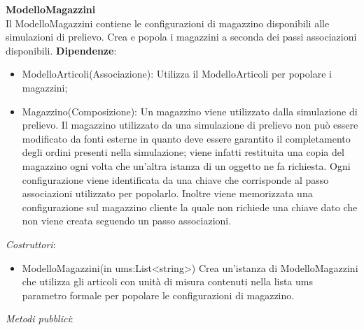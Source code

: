 \textbf{ModelloMagazzini}\\
Il ModelloMagazzini contiene le configurazioni di magazzino disponibili alle simulazioni di prelievo.
Crea e popola i magazzini a seconda dei passi associazioni disponibili.
\textbf{Dipendenze}:
\begin{itemize}
    \item ModelloArticoli(Associazione): Utilizza il ModelloArticoli per popolare i magazzini;\\
    \item Magazzino(Composizione): Un magazzino viene utilizzato dalla simulazione di prelievo. Il magazzino utilizzato da una simulazione di prelievo non può essere modificato 
    da fonti esterne in quanto deve essere garantito il completamento degli ordini presenti nella simulazione; viene infatti restituita una copia del magazzino ogni volta che un'altra 
    istanza di un oggetto ne fa richiesta.
    Ogni configurazione viene identificata da una chiave che corrisponde al passo associazioni utilizzato per popolarlo.
    Inoltre viene memorizzata una configurazione sul magazzino cliente la quale non richiede una chiave dato che non viene creata seguendo un passo associazioni.
\end{itemize}
\textit{Costruttori}:\\
\begin{itemize}
    \item ModelloMagazzini(in ums:List<string>)
    Crea un'istanza di ModelloMagazzini che utilizza gli articoli con unità di misura contenuti nella lista ums parametro formale per popolare le configurazioni di magazzino.
\end{itemize}
\textit{Metodi pubblici}:\\
